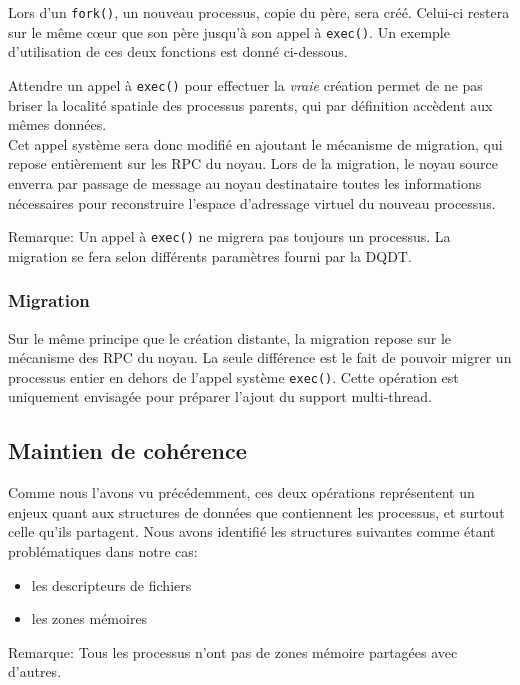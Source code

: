         Lors d'un \texttt{fork()}, un nouveau processus, copie du père, sera
        créé. Celui-ci restera sur le même c\oe ur que son père jusqu'à son
        appel à \texttt{exec()}. Un exemple d'utilisation de ces deux fonctions
        est donné ci-dessous.
        \clearpage

        
        \FloatBarrier

      Attendre un appel à \texttt{exec()} pour effectuer la \textit{vraie}
      création permet de ne pas briser la localité spatiale des processus
      parents, qui par définition accèdent aux mêmes données.\\

      Cet appel système sera donc modifié en ajoutant le mécanisme de migration,
      qui repose entièrement sur les RPC du noyau. Lors de la migration, le
      noyau source enverra par passage de message au noyau destinataire toutes
      les informations nécessaires pour reconstruire l'espace d'adressage
      virtuel du nouveau processus.

      \begin{paragraph}{Remarque:}
        Un appel à \texttt{exec()} ne migrera pas toujours un processus. La
        migration se fera selon différents paramètres fourni par la DQDT.
      \end{paragraph}

      \subsubsection{Migration}

        Sur le même principe que le création distante, la migration repose sur
        le mécanisme des RPC du noyau. La seule différence est le fait de
        pouvoir migrer un processus entier en dehors de l'appel système
        \texttt{exec()}. Cette opération est uniquement envisagée pour préparer
        l'ajout du support multi-thread.


    \subsection{Maintien de cohérence}

      Comme nous l'avons vu précédemment, ces deux opérations représentent un
      enjeux quant aux structures de données que contiennent les processus, et
      surtout celle qu'ils partagent. Nous avons identifié les structures
      suivantes comme étant problématiques dans notre cas:
      \begin{itemize}
      \item les descripteurs de fichiers
      \item les zones mémoires
      \end{itemize}
      \begin{paragraph}{Remarque:}
        Tous les processus n'ont pas de zones mémoire partagées avec d'autres.\\
      \end{paragraph}

